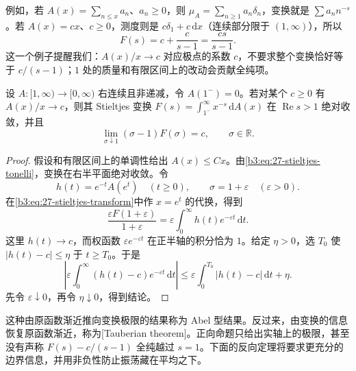 例如，若 \(A(x)=\sum_{n\le x}a_n\)、\(a_n\ge0\)，则 \(\mu_A=\sum_{n\ge1}a_n\delta_n\)，变换就是 \(\sum a_nn^{-s}\)。若 \(A(x)=cx\)、\(c\ge0\)，测度则是 \(c\delta_1+c\,\mathrm dx\)（连续部分限于 \((1,\infty)\)），所以
\[
 F(s)=c+\frac{c}{s-1}=\frac{cs}{s-1}.
\]
这一个例子提醒我们：\(A(x)/x\to c\) 对应极点的系数 \(c\)，不要求整个变换恰好等于 \(c/(s-1)\)；\(1\) 处的质量和有限区间上的改动会贡献全纯项。

\begin{proposition}
\label{b3:prop:27-abelian-limit}
设 \(A:[1,\infty)\to[0,\infty)\) 右连续且非递减，令 \(A(1^-)=0\)。若对某个 \(c\ge0\) 有 \(A(x)/x\to c\)，则其 Stieltjes 变换 \(F(s)=\int_{1^-}^\infty x^{-s}\,\mathrm dA(x)\) 在 \(\operatorname{Re}s>1\) 绝对收敛，并且
\[
 \lim_{\sigma\downarrow1}(\sigma-1)F(\sigma)=c,
 \qquad \sigma\in\mathbb R.
\]
\end{proposition}
\begin{proof}
假设和有限区间上的单调性给出 \(A(x)\le Cx\)。由\eqref{b3:eq:27-stieltjes-tonelli}，变换在右半平面绝对收敛。令
\[
 h(t)=e^{-t}A(e^t)\quad(t\ge0),\qquad
 \sigma=1+\varepsilon\quad(\varepsilon>0).
\]
在\eqref{b3:eq:27-stieltjes-transform}中作 \(x=e^t\) 的代换，得到
\[
 \frac{\varepsilon F(1+\varepsilon)}{1+\varepsilon}
 =\varepsilon\int_0^\infty h(t)e^{-\varepsilon t}\,\mathrm dt.
\]
这里 \(h(t)\to c\)，而权函数 \(\varepsilon e^{-\varepsilon t}\) 在正半轴的积分恰为 \(1\)。给定 \(\eta>0\)，选 \(T_0\) 使 \(|h(t)-c|\le\eta\) 于 \(t\ge T_0\)。于是
\[
 \left|\varepsilon\int_0^\infty
       (h(t)-c)e^{-\varepsilon t}\,\mathrm dt\right|
 \le\varepsilon\int_0^{T_0}|h(t)-c|\,\mathrm dt+\eta.
\]
先令 \(\varepsilon\downarrow0\)，再令 \(\eta\downarrow0\)，得到结论。
\end{proof}

这种由原函数渐近推向变换极限的结果称为 Abel 型结果。反过来，由变换的信息恢复原函数渐近，称为[Tauberian theorem]。正向命题只给出实轴上的极限，甚至没有声称 \(F(s)-c/(s-1)\) 全纯越过 \(s=1\)。下面的反向定理将要求更充分的边界信息，并用非负性防止振荡藏在平均之下。

\ProseParagraphBreak

